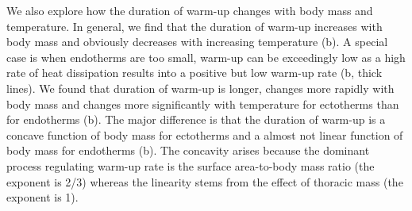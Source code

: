 We also explore how the duration of warm-up changes with body mass and temperature.
In general, we find that the duration of warm-up increases with body mass and obviously decreases with increasing temperature (b).
A special case is when endotherms are too small, warm-up can be exceedingly low as a high rate of heat dissipation results into a positive but low warm-up rate (b, thick lines).
We found that duration of warm-up is longer, changes more rapidly with body mass and changes more significantly with temperature for ectotherms than for endotherms (b). %
The major difference is that the duration of warm-up  is a concave function of body mass for ectotherms and a almost not linear function of body mass for endotherms (b).
The concavity arises because the dominant process regulating warm-up rate is the surface area-to-body mass ratio (the exponent is 2/3) whereas the linearity stems from the effect of thoracic mass (the exponent is 1).




